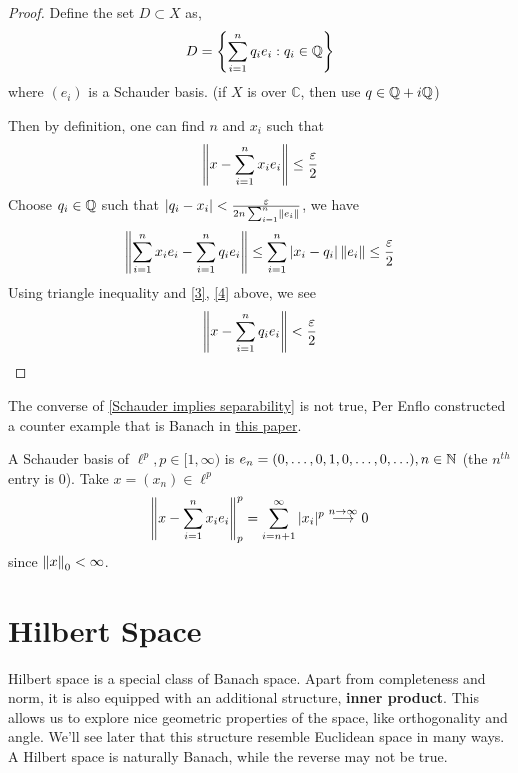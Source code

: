 \documentclass{article}
\begin{document}
\begin{proof}
    Define the set $D \subset X$ as,  
    $$
    D = \left\{\sum_{i=1}^n q_i e_i: q_i \in \mathbb{Q} \right\}
    $$  
    where $(e_i)$ is a Schauder basis. (if $X$ is over $\mathbb{C}$, then use $q \in \mathbb{Q} + i \mathbb{Q}$)
    
    Then by definition, one can find $n$ and $x_i$ such that  
    \begin{equation}
        \label{3}
        \left\|{x - \sum_{i=1}^n x_i e_i}\right\| \leq \frac{\varepsilon}{2}  
    \end{equation}
    Choose $q_i \in \mathbb{Q}$ such that $|q_i - x_i|<\frac{\varepsilon}{2n \sum_{i=1}^n \left\|{e_i}\right\|}$, we have  
    \begin{equation}
    \label{4}
        \left\|{\sum_{i=1}^n x_i e_i - \sum_{i=1}^n q_i e_i}\right\| \leq \sum_{i=1}^n |x_i-q_i| \left\|{e_i}\right\| \leq \frac{\varepsilon}{2}
    \end{equation}
    Using triangle inequality and \cref{3}, \cref{4} above, we see
    $$
    \left\|{x-\sum_{i=1}^n q_i e_i}\right\| < \frac{\varepsilon}{2}
    $$
\end{proof}

\begin{remark}
    The converse of \cref{Schauder implies separability} is not true, Per Enflo constructed a counter example that is Banach in \href{https://projecteuclid.org/download/pdf_1/euclid.acta/1485889774}{this paper}.
\end{remark}

\begin{example}
    A Schauder basis of $\ell^p, p\in [1, \infty)$ is $e_n=(0,\ldots, 0,1,0, \ldots,0,\ldots), n\in \mathbb{N}$ (the $n^{th}$ entry is $0$).  
    Take $x=(x_n)\in \ell^p$  
    $$
    \left\|{x-\sum_{i=1}^n x_ie_i}\right\|_p^p = \sum_{i=n+1}^{\infty} |x_i|^p \overset{n\to \infty}{\longrightarrow} 0
    $$  
    since $\left\|{x}\right\|_0 < \infty$.  
\end{example}


\newpage
\section{Hilbert Space}  

\begin{unexaminable}
Hilbert space is a special class of Banach space. 
Apart from completeness and norm, it is also equipped with an additional structure, 
{\bf inner product}. This allows us to explore nice geometric properties of the space, 
like orthogonality and angle. We'll see later that this structure resemble Euclidean space in many ways. A Hilbert space is naturally Banach, while the reverse may not be true.
\end{unexaminable}
\end{document}
